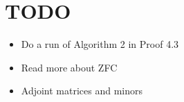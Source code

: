 \section{TODO}\par
\begin{itemize}
  \item Do a run of Algorithm 2 in Proof 4.3
  \item Read more about ZFC
  \item Adjoint matrices and minors
\end{itemize}
